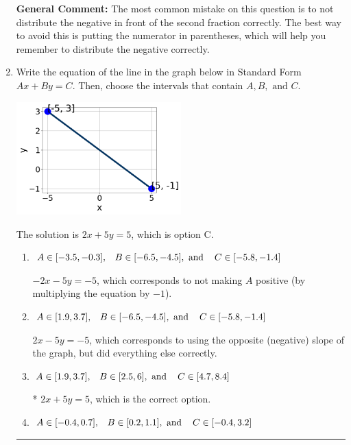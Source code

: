 \documentclass{extbook}[14pt]
\newcommand{\litem}[1]{\item #1

\rule{\textwidth}{0.4pt}}
\begin{document}
\begin{enumerate}
{\textbf{General Comment:} The most common mistake on this question is to not distribute the negative in front of the second fraction correctly. The best way to avoid this is putting the numerator in parentheses, which will help you remember to distribute the negative correctly.
}
\litem{
Write the equation of the line in the graph below in Standard Form $Ax+By=C$. Then, choose the intervals that contain $A, B, \text{ and } C$.

\begin{center}
    \includegraphics[width=0.5\textwidth]{../Figures/linearGraphToStandardCopyC.png}
\end{center}


The solution is \( 2x + 5y = 5 \), which is option C.\begin{enumerate}[label=\Alph*.]
\item \( A \in [-3.5, -0.3], \hspace{3mm} B \in [-6.5, -4.5], \text{ and } \hspace{3mm} C \in [-5.8, -1.4] \)

 $-2x - 5y = -5$, which corresponds to not making $A$ positive (by multiplying the equation by $-1$).
\item \( A \in [1.9, 3.7], \hspace{3mm} B \in [-6.5, -4.5], \text{ and } \hspace{3mm} C \in [-5.8, -1.4] \)

 $2x - 5y = -5$, which corresponds to using the opposite (negative) slope of the graph, but did everything else correctly.
\item \( A \in [1.9, 3.7], \hspace{3mm} B \in [2.5, 6], \text{ and } \hspace{3mm} C \in [4.7, 8.4] \)

* $2x + 5y = 5$, which is the correct option.
\item \( A \in [-0.4, 0.7], \hspace{3mm} B \in [0.2, 1.1], \text{ and } \hspace{3mm} C \in [-0.4, 3.2] \)


\end{enumerate}}
\end{enumerate}
\end{document}
